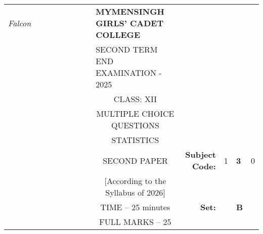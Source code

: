 \documentclass[12pt]{exam}
\begin{document}
\begin{table}[]
\begin{tabular}{llllllllcllll}
\textit{Falcon} &  &  &  &  &  &  &  & \multicolumn{1}{l}{\textbf{MYMENSINGH GIRLS' CADET COLLEGE}} &                                             &                        &                                 &                        \\
                &  &  &  &  &  &  &  & \multicolumn{1}{l}{SECOND TERM END EXAMINATION - 2025}       &                                             &                        & \multicolumn{1}{c}{}            &                        \\
                &  &  &  &  &  &  &  & CLASS: XII                                                   &                                             &                        & \multicolumn{1}{c}{}            &                        \\
                &  &  &  &  &  &  &  & MULTIPLE CHOICE QUESTIONS                                    &                                             &                        & \multicolumn{1}{c}{}            &                        \\
                &  &  &  &  &  &  &  & STATISTICS                                                   &                                             &                        & \multicolumn{1}{r}{}            &                        \\ \cline{11-13} 
                &  &  &  &  &  &  &  & SECOND PAPER                                                 & \multicolumn{1}{r|}{\textbf{Subject Code:}} & \multicolumn{1}{l|}{1} & \multicolumn{1}{l|}{\textbf{3}} & \multicolumn{1}{l|}{0} \\ \cline{11-13} 
                &  &  &  &  &  &  &  & [According to the Syllabus of 2026]                          & \multicolumn{1}{r}{}                        &                        &                                 &                        \\ \cline{12-12}
                &  &  &  &  &  &  &  & TIME – 25 minutes                                            & \multicolumn{1}{r}{\textbf{Set:}}           & \multicolumn{1}{l|}{}  & \multicolumn{1}{l|}{\textbf{B}} &                        \\ \cline{12-12}
                &  &  &  &  &  &  &  & FULL MARKS – 25                                              &                                             &                        &                                 &                       
\end{tabular}
\end{table}
\end{document}
